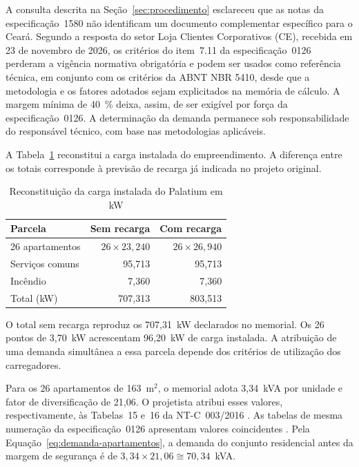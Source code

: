 A consulta descrita na Seção~\ref{sec:procedimento} esclareceu que as notas da especificação~1580 não identificam um documento complementar específico para o Ceará. Segundo a resposta do setor Loja Clientes Corporativos (CE), recebida em 23 de novembro de 2026, os critérios do item~7.11 da especificação~0126 perderam a vigência normativa obrigatória e podem ser usados como referência técnica, em conjunto com os critérios da ABNT NBR 5410, desde que a metodologia e os fatores adotados sejam explicitados na memória de cálculo. A margem mínima de 40~\% deixa, assim, de ser exigível por força da especificação~0126. A determinação da demanda permanece sob responsabilidade do responsável técnico, com base nas metodologias aplicáveis.

A Tabela~\ref{tab:cargas-caso} reconstitui a carga instalada do empreendimento. A diferença entre os totais corresponde à previsão de recarga já indicada no projeto original.

\begin{table}[!htbp]
\centering
\caption{Reconstituição da carga instalada do Palatium em kW}\label{tab:cargas-caso}
\begin{tabular}{lrr}\hline
Parcela & Sem recarga & Com recarga \\\hline
26 apartamentos & \(26\times23{,}240\) & \(26\times26{,}940\) \\
Serviços comuns & 95,713 & 95,713 \\
Incêndio & 7,360 & 7,360 \\\hline
Total (kW) & 707,313 & 803,513 \\\hline
\end{tabular}
\end{table}

O total sem recarga reproduz os 707,31~kW declarados no memorial. Os 26 pontos de 3,70~kW acrescentam 96,20~kW de carga instalada. A atribuição de uma demanda simultânea a essa parcela depende dos critérios de utilização dos carregadores.

Para os 26 apartamentos de 163~\(\mathrm{m}^2\), o memorial adota 3,34~kVA por unidade e fator de diversificação de 21,06. O projetista atribui esses valores, respectivamente, às Tabelas~15 e~16 da NT-C~003/2016 \cite[p.~7]{palatiummemorial2025}. As tabelas de mesma numeração da especificação~0126 apresentam valores coincidentes \cite[tabelas~15 e~16]{enel0126}. Pela Equação~\ref{eq:demanda-apartamentos}, a demanda do conjunto residencial antes da margem de segurança é de \(3{,}34\times21{,}06\cong70{,}34\)~kVA.

